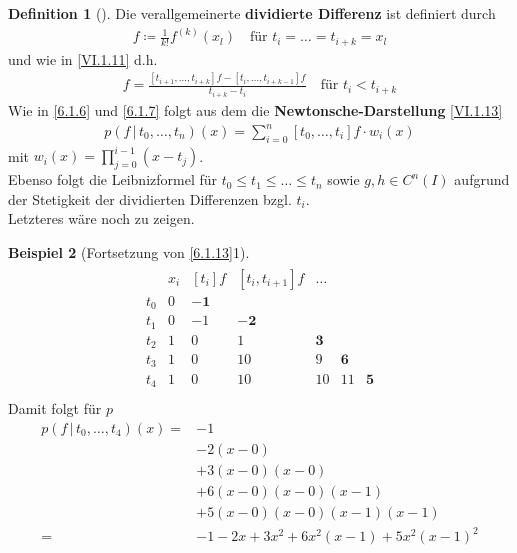\documentclass[ngerman,fontsize=11pt, paper=a4, parskip=half, titlepage=true, toc=bib]{scrbook}
\theoremstyle{definition}
\newtheorem{Def}{Definition}[section]		%
\newtheorem{Bsp}[Def]{Beispiel}
\theoremstyle{plain}
\newenvironment{Bspe}[1][]{ %
  \begin{Bsp}[#1]}
  {\end{Bsp}
  	\addtocounter{subsection}{1}}
\newenvironment{Defe}[1][]{ %
  \begin{Def}[#1]}
  {\end{Def}
  	\addtocounter{subsection}{1}}
\begin{document}
\begin{Defe}
  Die verallgemeinerte \textbf{dividierte Differenz}
ist definiert durch 
\begin{gather*}
  [t_i,\dots, t_{i+k}]f \coloneqq \frac{1}{k!} f^{(k)}(x_l)
\quad \text{für } t_i=\dots = t_{i+k}=x_l 
\end{gather*}
und wie in \eqref{VI.1.11} d.h.
\begin{gather*}
  [t_i,\dots, t_{i+k}]f = \frac{[t_{i+1},\dots, t_{i+k}]f
                                - [t_i,\dots,t_{i+k-1}]f}
                              {t_{i+k}-t_i}
\quad \text{für } t_i<t_{i+k}
\end{gather*}
Wie in \ref{6.1.6} und \ref{6.1.7} folgt aus dem 
die \textbf{Newtonsche-Darstellung} \eqref{VI.1.13}
\begin{gather*}
  p(f\,|\, t_0,\dots, t_{n})(x) = \sum_{i=0}^{n}[t_0,\dots,t_i]f\cdot w_i(x) 
\end{gather*}
mit $w_i(x) =\prod_{j=0}^{i-1}(x-t_j)$.\\
Ebenso folgt die Leibnizformel für $t_0\leq t_1\leq\dots\leq t_n$
sowie $g,h\in C^n(I)$ aufgrund der Stetigkeit
 der dividierten Differenzen bzgl. $t_i$.\\
Letzteres wäre noch zu zeigen.
\end{Defe}


\begin{Bspe}[Fortsetzung von \ref{6.1.13}1]\label{6.1.16}
  \begin{align*}
    \begin{array}{ccccccc}
      &   x_i& [t_i]f & [t_i,t_{i+1}]f &\dots \\
      t_0 &0 & \boldsymbol{-1} \\
      t_1 &0 & -1 & \boldsymbol{-2}\\ 
      t_2 &1 & 0  & 1  &\boldsymbol{3} \\
      t_3 &1 & 0  & 10 &9  &\boldsymbol{6} \\
      t_4 &1 & 0  & 10 &10 &11 & \boldsymbol{5}
    \end{array}\\
  \end{align*}
  Damit folgt für $p$
  \begin{align*}
    p(f\,|\,t_0,\dots, t_4)(x) 
    =& -1\\
	  &-2(x-0)\\
     & +3(x-0)(x-0)\\
     & +6(x-0)(x-0)(x-1)\\
     & +5(x-0)(x-0)(x-1)(x-1)\\
    =&-1-2x+3x^2+6x^2(x-1)+5x^2(x-1)^2
  \end{align*}
\end{Bspe}
\end{document}
